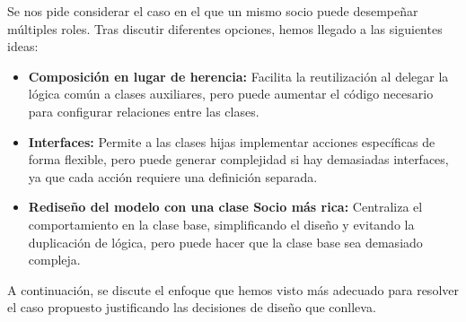 
Se nos pide considerar el caso en el que un mismo socio puede desempeñar 
múltiples roles. Tras discutir diferentes opciones, hemos llegado a las siguientes ideas:

\begin{itemize}
    \item \textbf{Composición en lugar de herencia:} 
    Facilita la reutilización al delegar la lógica común a clases auxiliares,
    pero puede aumentar el código necesario para configurar relaciones entre las clases.
    \item \textbf{Interfaces:} 
    Permite a las clases hijas implementar acciones específicas de forma flexible,
    pero puede generar complejidad si hay demasiadas interfaces, ya que cada acción
    requiere una definición separada.
    \item \textbf{Rediseño del modelo con una clase Socio más rica:}
    Centraliza el comportamiento en la clase base, simplificando el diseño y
    evitando la duplicación de lógica, pero puede hacer que la clase base sea
    demasiado compleja.
\end{itemize}

A continuación, se discute el enfoque que hemos visto más adecuado para resolver 
el caso propuesto justificando las decisiones de diseño que conlleva.

\newpage